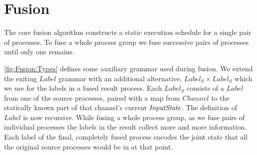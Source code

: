 





\section{Fusion}
\label{s:Fusion}

The core fusion algorithm constructs a static execution schedule for a single pair of processes. To fuse a whole process group we fuse successive pairs of processes until only one remains. 

\autoref{fig:Fusion:Types} defines some auxiliary grammar used during fusion. We extend the exiting $Label$ grammar with an additional alternative, $Label_S \times Label_S$ which we use for the labels in a fused result process. Each $Label_S$ consists of a $Label$ from one of the  source processes, paired with a map from $Channel$ to the statically known part of that channel's current $\textit{InputState}$. The definition of $Label$ is now recursive. While fusing a whole process group, as we fuse pairs of individual processes the labels in the result collect more and more information. Each label of the final, completely fused process encodes the joint state that all the original source processes would be in at that point.

